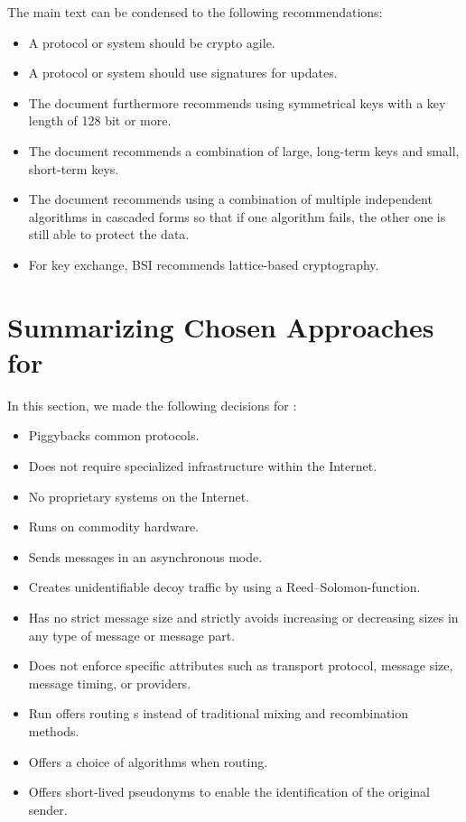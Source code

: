 \begin{itemize}
	The main text can be condensed to the following recommendations:
	\begin{itemize}
		\item A protocol or system should be crypto agile.
		\item A protocol or system should use signatures for updates.
		\item The document furthermore recommends using symmetrical keys with a key length of 128 bit or more.
		\item The document recommends a combination of large, long-term keys and small, short-term keys.
		\item The document recommends using a combination of multiple independent algorithms in cascaded forms so that if one algorithm fails, the other one is still able to protect the data.
		\item For key exchange, BSI recommends lattice-based cryptography.
	\end{itemize} 
\end{itemize}

\section{Summarizing Chosen Approaches for \MessageVortex}\label{sec:reqSummary}
In this section, we made the following decisions for \MessageVortex:
\begin{itemize}
	\item Piggybacks common protocols.
	\item Does not require specialized infrastructure within the Internet.
	\item No proprietary systems on the Internet.
	\item Runs on commodity hardware.
	\item Sends messages in an asynchronous mode.
	\item Creates unidentifiable decoy traffic by using a Reed--Solomon-function.
	\item Has no strict message size and strictly avoids increasing or decreasing sizes in any type of message or message part.
	\item Does not enforce specific attributes such as transport protocol, message size, message timing, or providers.
	\item Run offers routing s instead of traditional mixing and recombination methods.
	\item Offers a choice of algorithms when routing.
	\item Offers short-lived pseudonyms to enable the identification of the original sender.
\end{itemize}


